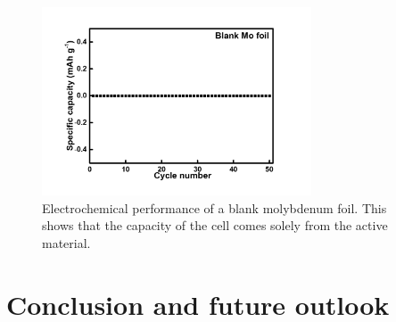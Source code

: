 \begin{figure}[htb!]
\centering
\includegraphics[width=8cm]{Figures/chap4fig/S8}
\caption{Electrochemical performance of a blank molybdenum foil. This shows that the capacity of the cell comes solely from the active material.}
\label{Figures/chap4fig:S8}
\end{figure}
\section{Conclusion and future outlook}


